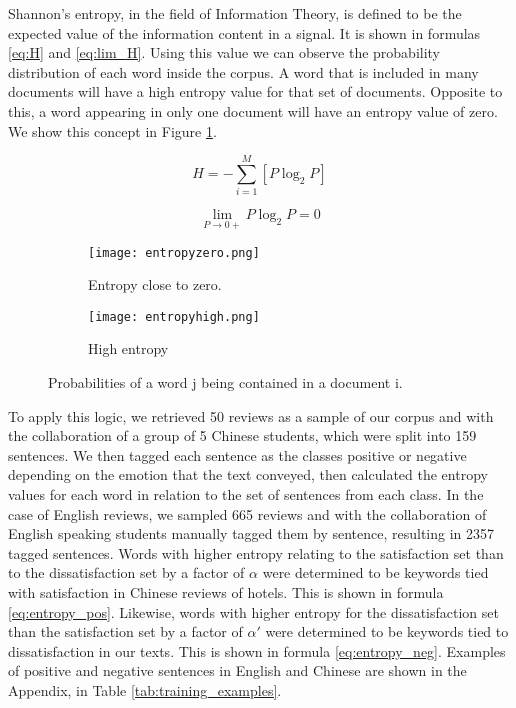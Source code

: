 \documentclass[review]{elsarticle}
\begin{document}
Shannon’s entropy, in the field of Information Theory, is defined to be the expected value of the information content in a signal. It is shown in formulas \ref{eq:H} and \ref{eq:lim_H}. Using this value we can observe the probability distribution of each word inside the corpus. A word that is included in many documents will have a high entropy value for that set of documents. Opposite to this, a word appearing in only one document will have an entropy value of zero. We show this concept in Figure \ref{fig:entropygraphs}.

\begin{equation}\label{eq:H}
H = - \sum_{i=1}^M [P \log_2 P]
\end{equation}

\begin{equation}\label{eq:lim_H}
\lim_{P\to0+} P \log_2 P = 0
\end{equation}

\begin{figure}[bp]
    \centering
    \begin{subfigure}[b]{0.4\linewidth}
        \texttt{[image: entropyzero.png]}
        \caption{Entropy close to zero.}
    \end{subfigure}
    \begin{subfigure}[b]{0.4\linewidth}
        \texttt{[image: entropyhigh.png]}
        \caption{High entropy}
    \end{subfigure}
\caption{Probabilities of a word j being contained in a document i.}
\label{fig:entropygraphs}
\end{figure}

To apply this logic, we retrieved 50 reviews as a sample of our corpus and with the collaboration of a group of 5 Chinese students, which were split into 159 sentences. We then tagged each sentence as the classes positive or negative depending on the emotion that the text conveyed, then calculated the entropy values for each word in relation to the set of sentences from each class. In the case of English reviews, we sampled 665 reviews and with the collaboration of English speaking students manually tagged them by sentence, resulting in \num[group-separator={,}]{2357} tagged sentences. Words with higher entropy relating to the satisfaction set than to the dissatisfaction set by a factor of \(\alpha\) were determined to be keywords tied with satisfaction in Chinese reviews of hotels. This is shown in formula \ref{eq:entropy_pos}. Likewise, words with higher entropy for the dissatisfaction set than the satisfaction set by a factor of \(\alpha'\) were determined to be keywords tied to dissatisfaction in our texts. This is shown in formula \ref{eq:entropy_neg}. Examples of positive and negative sentences in English and Chinese are shown in the Appendix, in Table \ref{tab:training_examples}.
\end{document}
